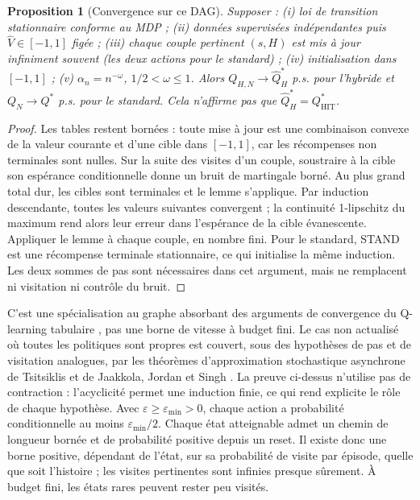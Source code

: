 \documentclass[11pt,a4paper]{article}
\newtheorem{proposition}{Proposition}
\theoremstyle{remark}\newtheorem*{remarque}{Remarque}
\newcommand{\1}{\mathbf 1}
\newcommand{\QH}{Q^*_{\mathrm{HIT}}}
\begin{document}
\begin{proposition}[Convergence sur ce DAG]
Supposer : (i) loi de transition stationnaire conforme au MDP ; (ii) données
supervisées indépendantes puis $\widehat V\in[-1,1]$ figée ; (iii) chaque
couple pertinent $(s,H)$ est mis à jour infiniment souvent (les deux actions
pour le standard) ; (iv) initialisation dans $[-1,1]$ ; (v)
$\alpha_n=n^{-\omega}$, $1/2<\omega\le1$. Alors
$Q_{H,N}\to\widehat Q^*_H$ p.s. pour l'hybride et $Q_N\to Q^*$ p.s.
pour le standard. Cela n'affirme pas que $\widehat Q^*_H=\QH$.
\end{proposition}
\begin{proof}
Les tables restent bornées : toute mise à jour est une combinaison convexe de
la valeur courante et d'une cible dans $[-1,1]$, car les récompenses non
terminales sont nulles. Sur la suite des visites d'un couple, soustraire à la
cible son espérance conditionnelle donne un bruit de martingale borné.
Au plus grand total dur, les cibles sont terminales et le lemme s'applique.
Par induction descendante, toutes les valeurs suivantes convergent ; la
continuité 1-lipschitz du maximum rend alors leur erreur dans l'espérance de
la cible évanescente. Appliquer le lemme à chaque couple, en nombre fini.
Pour le standard, STAND est une récompense terminale stationnaire, ce qui
initialise la même induction. Les deux sommes de pas sont nécessaires dans
cet argument, mais ne remplacent ni visitation ni contrôle du bruit.
\end{proof}
C'est une spécialisation au graphe absorbant des arguments de convergence
du Q-learning tabulaire \cite{watkins}, pas une borne de vitesse à budget fini.
Le cas non actualisé où toutes les politiques sont propres est couvert, sous des
hypothèses de pas et de visitation analogues, par les théorèmes d'approximation
stochastique asynchrone de Tsitsiklis et de Jaakkola, Jordan et Singh
\cite{tsitsiklis,jaakkola}. La preuve ci-dessus n'utilise pas de contraction :
l'acyclicité permet une induction finie, ce qui rend explicite le rôle de
chaque hypothèse.
Avec $\varepsilon\ge\varepsilon_{\min}>0$, chaque action a probabilité
conditionnelle au moins $\varepsilon_{\min}/2$. Chaque état atteignable admet
un chemin de longueur bornée et de probabilité positive depuis un reset.
Il existe donc une borne positive, dépendant de l'état, sur sa probabilité de
visite par épisode, quelle que soit l'histoire ; les visites pertinentes sont
infinies presque sûrement. À budget fini, les états rares peuvent rester peu visités.
\end{document}
